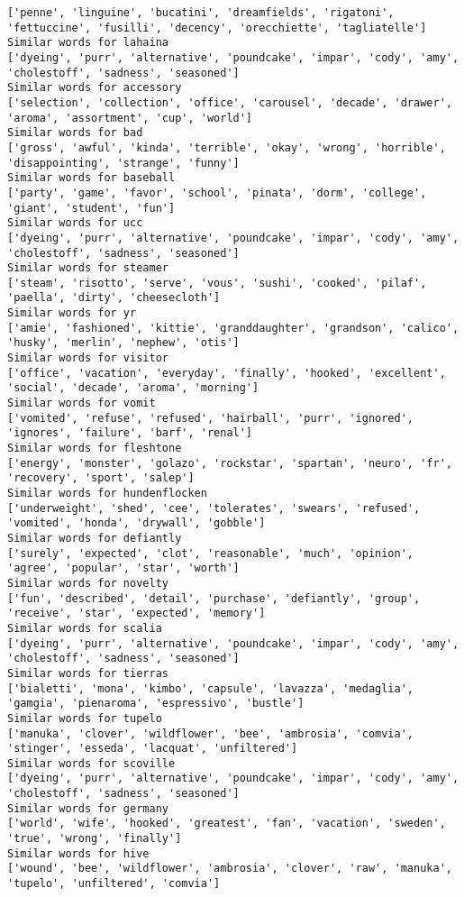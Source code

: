 \documentclass[11pt]{article}
\begin{document}
\begin{Verbatim}[commandchars=\\\{\}]
['penne', 'linguine', 'bucatini', 'dreamfields', 'rigatoni', 'fettuccine', 'fusilli', 'decency', 'orecchiette', 'tagliatelle']
Similar words for lahaina
['dyeing', 'purr', 'alternative', 'poundcake', 'impar', 'cody', 'amy', 'cholestoff', 'sadness', 'seasoned']
Similar words for accessory
['selection', 'collection', 'office', 'carousel', 'decade', 'drawer', 'aroma', 'assortment', 'cup', 'world']
Similar words for bad
['gross', 'awful', 'kinda', 'terrible', 'okay', 'wrong', 'horrible', 'disappointing', 'strange', 'funny']
Similar words for baseball
['party', 'game', 'favor', 'school', 'pinata', 'dorm', 'college', 'giant', 'student', 'fun']
Similar words for ucc
['dyeing', 'purr', 'alternative', 'poundcake', 'impar', 'cody', 'amy', 'cholestoff', 'sadness', 'seasoned']
Similar words for steamer
['steam', 'risotto', 'serve', 'vous', 'sushi', 'cooked', 'pilaf', 'paella', 'dirty', 'cheesecloth']
Similar words for yr
['amie', 'fashioned', 'kittie', 'granddaughter', 'grandson', 'calico', 'husky', 'merlin', 'nephew', 'otis']
Similar words for visitor
['office', 'vacation', 'everyday', 'finally', 'hooked', 'excellent', 'social', 'decade', 'aroma', 'morning']
Similar words for vomit
['vomited', 'refuse', 'refused', 'hairball', 'purr', 'ignored', 'ignores', 'failure', 'barf', 'renal']
Similar words for fleshtone
['energy', 'monster', 'golazo', 'rockstar', 'spartan', 'neuro', 'fr', 'recovery', 'sport', 'salep']
Similar words for hundenflocken
['underweight', 'shed', 'cee', 'tolerates', 'swears', 'refused', 'vomited', 'honda', 'drywall', 'gobble']
Similar words for defiantly
['surely', 'expected', 'clot', 'reasonable', 'much', 'opinion', 'agree', 'popular', 'star', 'worth']
Similar words for novelty
['fun', 'described', 'detail', 'purchase', 'defiantly', 'group', 'receive', 'star', 'expected', 'memory']
Similar words for scalia
['dyeing', 'purr', 'alternative', 'poundcake', 'impar', 'cody', 'amy', 'cholestoff', 'sadness', 'seasoned']
Similar words for tierras
['bialetti', 'mona', 'kimbo', 'capsule', 'lavazza', 'medaglia', 'gamgia', 'pienaroma', 'espressivo', 'bustle']
Similar words for tupelo
['manuka', 'clover', 'wildflower', 'bee', 'ambrosia', 'comvia', 'stinger', 'esseda', 'lacquat', 'unfiltered']
Similar words for scoville
['dyeing', 'purr', 'alternative', 'poundcake', 'impar', 'cody', 'amy', 'cholestoff', 'sadness', 'seasoned']
Similar words for germany
['world', 'wife', 'hooked', 'greatest', 'fan', 'vacation', 'sweden', 'true', 'wrong', 'finally']
Similar words for hive
['wound', 'bee', 'wildflower', 'ambrosia', 'clover', 'raw', 'manuka', 'tupelo', 'unfiltered', 'comvia']

\end{Verbatim}
\end{document}
